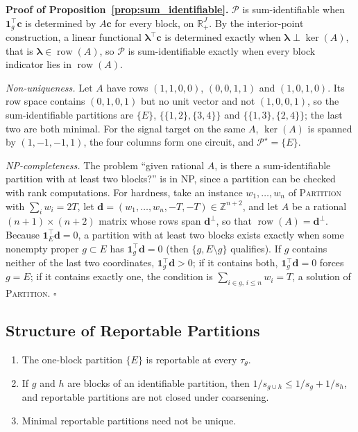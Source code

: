 \noindent\textbf{Proof of Proposition~\ref{prop:sum_identifiable}.}
\(\mathcal P\) is sum-identifiable when \(\mathbf 1_g^\top\mathbf c\) is determined by
\(A\mathbf c\) for every block, on \(\mathbb R_+^J\).  By the interior-point construction, a linear functional
\(\boldsymbol\lambda^\top\mathbf c\) is determined exactly when
\(\boldsymbol\lambda\perp\ker(A)\), that is
\(\boldsymbol\lambda\in\operatorname{row}(A)\), so \(\mathcal P\) is sum-identifiable
exactly when every block indicator lies in \(\operatorname{row}(A)\).

\emph{Non-uniqueness.}  Let \(A\) have rows \((1,1,0,0)\), \((0,0,1,1)\) and
\((1,0,1,0)\).  Its row space contains \((0,1,0,1)\) but no unit vector and not
\((1,0,0,1)\), so the sum-identifiable partitions are \(\{E\}\),
\(\{\{1,2\},\{3,4\}\}\) and \(\{\{1,3\},\{2,4\}\}\); the last two are both minimal.
For the signal target on the same \(A\), \(\ker(A)\) is spanned by
\((1,-1,-1,1)\), the four columns form one circuit, and
\(\mathcal P^\star=\{E\}\).

\emph{NP-completeness.}  The problem ``given rational \(A\), is there a
sum-identifiable partition with at least two blocks?'' is in NP, since
a partition can be checked with rank computations.  For hardness, take an instance
\(w_1,\dots,w_n\) of \textsc{Partition} \citep{garey1979computers} with
\(\sum_iw_i=2T\), let \(\mathbf d=(w_1,\dots,w_n,-T,-T)\in\mathbb Z^{n+2}\), and let
\(A\) be a rational \((n+1)\times(n+2)\) matrix whose rows span
\(\mathbf d^\perp\), so that \(\operatorname{row}(A)=\mathbf d^\perp\).  Because
\(\mathbf 1_E^\top\mathbf d=0\), a partition with at least two blocks exists exactly
when some nonempty proper \(g\subset E\) has \(\mathbf 1_g^\top\mathbf d=0\) (then
\(\{g,E\setminus g\}\) qualifies).  If \(g\) contains neither of the last two
coordinates, \(\mathbf 1_g^\top\mathbf d>0\); if it contains both,
\(\mathbf 1_g^\top\mathbf d=0\) forces \(g=E\); if it contains exactly one, the
condition is \(\sum_{i\in g,\,i\le n}w_i=T\), a solution of \textsc{Partition}.
\(\square\)

\subsection{Structure of Reportable Partitions}

\begin{proposition}
\label{prop:reportable_structure}
\leavevmode
\begin{enumerate}[label=(\alph*),leftmargin=*,itemsep=0pt,topsep=2pt]
  \item The one-block partition \(\{E\}\) is reportable at every \(\tau_\theta\).
  \item If \(g\) and \(h\) are blocks of an identifiable partition, then
  \(1/s_{g\cup h}\le1/s_g+1/s_h\), and reportable partitions are not closed under
  coarsening.
  \item Minimal reportable partitions need not be unique.
\end{enumerate}
\end{proposition}

